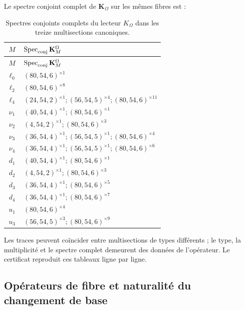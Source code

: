 Le spectre conjoint complet de \(\mathbf K_\Omega\) sur les mêmes fibres est :

\begingroup\footnotesize
\begin{longtable}{@{}c p{}@{}}
\caption{Spectres conjoints complets du lecteur \(K_\Omega\) dans les treize
multisections canoniques.}
\label{tab:espectros-komega-multisecciones-rev11}\\
\toprule
\(M\)&\(\operatorname{Spec}_{\rm conj}\mathbf K_M^\Omega\)\\
\midrule
\endfirsthead
\toprule
\(M\)&\(\operatorname{Spec}_{\rm conj}\mathbf K_M^\Omega\)\\
\midrule
\endhead
\(\ell_0\)&\((80,54,6)^{\times1}\)\\
\(\ell_2\)&\((80,54,6)^{\times8}\)\\
\(\ell_4\)&\((24,54,2)^{\times1};(56,54,5)^{\times4};(80,54,6)^{\times11}\)\\
\(\nu_1\)&\((40,54,4)^{\times1};(80,54,6)^{\times1}\)\\
\(\nu_2\)&\((4,54,2)^{\times1};(80,54,6)^{\times3}\)\\
\(\nu_3\)&\((36,54,4)^{\times1};(56,54,5)^{\times1};(80,54,6)^{\times4}\)\\
\(\nu_4\)&\((36,54,4)^{\times1};(56,54,5)^{\times1};(80,54,6)^{\times6}\)\\
\(d_1\)&\((40,54,4)^{\times1};(80,54,6)^{\times1}\)\\
\(d_2\)&\((4,54,2)^{\times1};(80,54,6)^{\times3}\)\\
\(d_3\)&\((36,54,4)^{\times1};(80,54,6)^{\times5}\)\\
\(d_4\)&\((36,54,4)^{\times1};(80,54,6)^{\times7}\)\\
\(u_1\)&\((80,54,6)^{\times4}\)\\
\(u_3\)&\((56,54,5)^{\times3};(80,54,6)^{\times9}\)\\
\bottomrule
\end{longtable}
\endgroup

Les traces peuvent coïncider entre multisections de types différents ; le type,
la multiplicité et le spectre complet demeurent des données de l'opérateur.
Le certificat reproduit ces tableaux ligne par ligne.

\subsection{Opérateurs de fibre et naturalité du changement de base}

